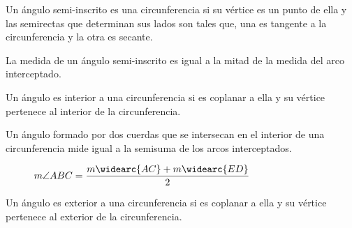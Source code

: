 \begin{definition}
    Un ángulo semi-inscrito es una circunferencia si su vértice es un punto de ella y las semirectas que determinan sus lados son tales que, una es tangente a la circunferencia y la otra es secante.
\end{definition}

\begin{theorem}
    La medida de un ángulo semi-inscrito es igual a la mitad de la medida del arco interceptado.

    \begin{figure}[!h]
        \centering
        
        \label{fig:theorem32}
    \end{figure}
    
\end{theorem}

\clearpage

\begin{definition}
    Un ángulo es interior a una circunferencia si es coplanar a ella y su vértice pertenece al interior de la circunferencia.
\end{definition}

\begin{theorem}
    Un ángulo formado por dos cuerdas que se intersecan en el interior de una circunferencia mide igual a la semisuma de los arcos interceptados.

    \begin{figure}[!h]
        \centering
        
        \caption{$m\angle{ABC} = \dfrac{m\widearc{AC} + m\widearc{ED}}{2}$}
        \label{fig:theorem34}
    \end{figure}
    
\end{theorem}

\clearpage

\begin{definition}
    Un ángulo es exterior a una circunferencia si es coplanar a ella y su vértice pertenece al exterior de la circunferencia.
\end{definition}

